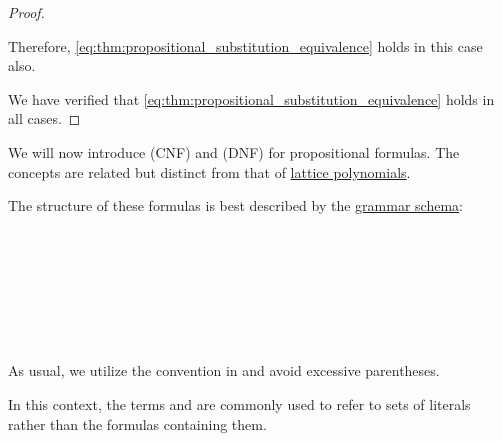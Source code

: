 \begin{proof}
\begin{itemize}
    Therefore, \eqref{eq:thm:propositional_substitution_equivalence} holds in this case also.
  \end{itemize}

  We have verified that \eqref{eq:thm:propositional_substitution_equivalence} holds in all cases.
\end{proof}

\begin{definition}\label{def:cnf_and_dnf}
  We will now introduce  (CNF) and  (DNF) for propositional formulas. The concepts are related but distinct from that of \hyperref[rem:lattice_polynomials]{lattice polynomials}.

  \begin{thmenum}
     The structure of these formulas is best described by the \hyperref[rem:backus_normal_form]{grammar schema}:
    \begin{bnf*}
           {} \\
           {\neg {}} \\
                    { \bnfor {}} \\
                   { \bnfor \bnftsq{(} \bnfsp {}  \bnfsp \bnftsq{\( \vee \)}   \bnfsp {} \bnfsp \bnftsq{)}} \\
                        {     \bnfor \bnftsq{(} \bnfsp {} \bnfsp \bnftsq{\( \wedge \)} \bnfsp {}      \bnfsp \bnftsq{)}} \\
                   { \bnfor \bnftsq{(} \bnfsp {}  \bnfsp \bnftsq{\( \wedge \)} \bnfsp {} \bnfsp \bnftsq{)}} \\
                        {     \bnfor \bnftsq{(} \bnfsp {} \bnfsp \bnftsq{\( \vee \)}   \bnfsp {}      \bnfsp \bnftsq{)}}
    \end{bnf*}

    As usual, we utilize the convention in  and avoid excessive parentheses.

    In this context, the terms  and  are commonly used to refer to sets of literals rather than the formulas containing them.


\end{thmenum}
\end{definition}
